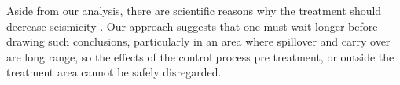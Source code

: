 Aside from our analysis, there are scientific reasons why the treatment should decrease seismicity \cite{LangenbruchZoback2016,Hincks2018}. Our approach suggests that one must wait longer before drawing such conclusions, particularly in an area where spillover and carry over are long range, so the effects of the control process pre treatment, or outside the treatment area cannot be safely disregarded.

% 
